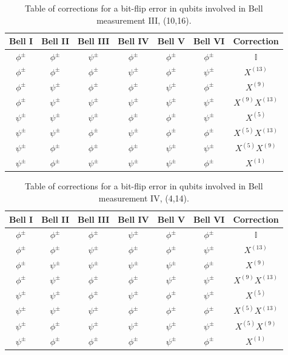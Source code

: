 \documentclass[10pt,a4paper]{book}
\numberwithin{equation}{chapter}
\numberwithin{figure}{chapter}
\numberwithin{table}{chapter}
\begin{document}
\begin{appendices}
\begin{table}[H]
    \centering
    \begin{tabular}{|c c c c c c|c|}
    \hline
   Bell I & Bell II & Bell III & Bell IV & Bell V & Bell VI & Correction \\
    \hline
  $\phi^{\pm}$&$\phi^{\pm}$&$\psi^{\pm}$&$\phi^{\pm}$&$\phi^{\pm}$&$\phi^{\pm}$&$\mathbb{I}$\\
 $\phi^{\pm}$&$\phi^{\pm}$&$\phi^{\pm}$&$\psi^{\pm}$&$\phi^{\pm}$&$\psi^{\pm}$&$X^{(13)}$\\
 $\phi^{\pm}$&$\psi^{\pm}$&$\phi^{\pm}$&$\phi^{\pm}$&$\psi^{\pm}$&$\phi^{\pm}$&$X^{(9)}$\\
 $\phi^{\pm}$&$\psi^{\pm}$&$\psi^{\pm}$&$\psi^{\pm}$&$\psi^{\pm}$&$\psi^{\pm}$&$X^{(9)}X^{(13)}$\\
 $\psi^{\pm}$&$\psi^{\pm}$&$\psi^{\pm}$&$\phi^{\pm}$&$\phi^{\pm}$&$\psi^{\pm}$&$X^{(5)}$\\
 $\psi^{\pm}$&$\psi^{\pm}$&$\phi^{\pm}$&$\psi^{\pm}$&$\phi^{\pm}$&$\phi^{\pm}$&$X^{(5)}X^{(13)}$\\
 $\psi^{\pm}$&$\phi^{\pm}$&$\phi^{\pm}$&$\phi^{\pm}$&$\psi^{\pm}$&$\psi^{\pm}$&$X^{(5)}X^{(9)}$\\
 $\psi^{\pm}$&$\phi^{\pm}$&$\psi^{\pm}$&$\psi^{\pm}$&$\psi^{\pm}$&$\phi^{\pm}$&$X^{(1)}$\\
   \hline
    \end{tabular}
	\caption{\footnotesize Table of corrections for a bit-flip error in qubits involved in Bell measurement III, (10,16).}
	\label{tab:GHZ4errorIII}
\end{table} 

\begin{table}[H]
    \centering
    \begin{tabular}{|c c c c c c|c|}
    \hline
   Bell I & Bell II & Bell III & Bell IV & Bell V & Bell VI & Correction \\
    \hline
  $\phi^{\pm}$&$\phi^{\pm}$&$\phi^{\pm}$&$\psi^{\pm}$&$\phi^{\pm}$&$\phi^{\pm}$&$\mathbb{I}$\\
 $\phi^{\pm}$&$\phi^{\pm}$&$\psi^{\pm}$&$\phi^{\pm}$&$\phi^{\pm}$&$\psi^{\pm}$&$X^{(13)}$\\
 $\phi^{\pm}$&$\psi^{\pm}$&$\psi^{\pm}$&$\psi^{\pm}$&$\psi^{\pm}$&$\phi^{\pm}$&$X^{(9)}$\\
 $\phi^{\pm}$&$\psi^{\pm}$&$\phi^{\pm}$&$\phi^{\pm}$&$\psi^{\pm}$&$\psi^{\pm}$&$X^{(9)}X^{(13)}$\\
 $\psi^{\pm}$&$\psi^{\pm}$&$\phi^{\pm}$&$\psi^{\pm}$&$\phi^{\pm}$&$\psi^{\pm}$&$X^{(5)}$\\
 $\psi^{\pm}$&$\psi^{\pm}$&$\psi^{\pm}$&$\phi^{\pm}$&$\phi^{\pm}$&$\phi^{\pm}$&$X^{(5)}X^{(13)}$\\
 $\psi^{\pm}$&$\phi^{\pm}$&$\psi^{\pm}$&$\psi^{\pm}$&$\psi^{\pm}$&$\psi^{\pm}$&$X^{(5)}X^{(9)}$\\
 $\psi^{\pm}$&$\phi^{\pm}$&$\phi^{\pm}$&$\phi^{\pm}$&$\psi^{\pm}$&$\phi^{\pm}$&$X^{(1)}$\\
   \hline
    \end{tabular}
	\caption{\footnotesize Table of corrections for a bit-flip error in qubits involved in Bell measurement IV, (4,14).}
	\label{tab:GHZ4errorIV}
\end{table}


\end{appendices}
\end{document}
